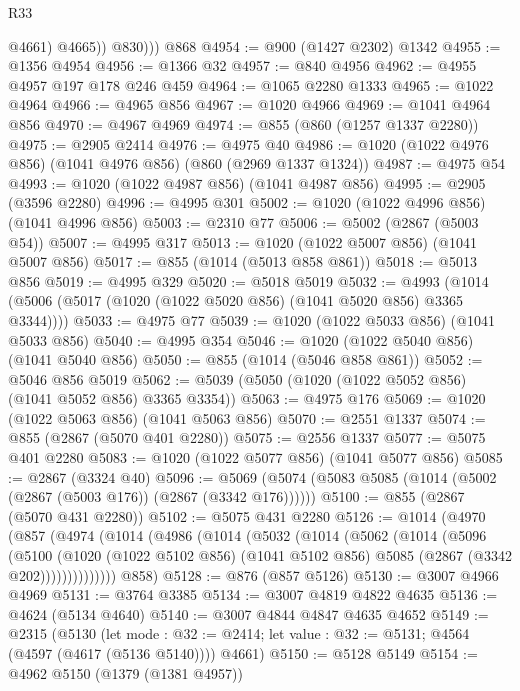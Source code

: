 \begin{lexlean}{R33}
\begin{coremodule}
              @4661)
            @4665))
          @830)))
    @868
@4954 := @900 (@1427 @2302) @1342
@4955 := @1356 @4954
@4956 := @1366 @32
@4957 := @840 @4956
@4962 := @4955 @4957 @197 @178 @246 @459
@4964 := @1065 @2280 @1333
@4965 := @1022 @4964
@4966 := @4965 @856
@4967 := @1020 @4966
@4969 := @1041 @4964 @856
@4970 := @4967 @4969
@4974 := @855 (@860 (@1257 @1337 @2280))
@4975 := @2905 @2414
@4976 := @4975 @40
@4986 := @1020 (@1022 @4976 @856) (@1041 @4976 @856) (@860 (@2969 @1337 @1324))
@4987 := @4975 @54
@4993 := @1020 (@1022 @4987 @856) (@1041 @4987 @856)
@4995 := @2905 (@3596 @2280)
@4996 := @4995 @301
@5002 := @1020 (@1022 @4996 @856) (@1041 @4996 @856)
@5003 := @2310 @77
@5006 := @5002 (@2867 (@5003 @54))
@5007 := @4995 @317
@5013 := @1020 (@1022 @5007 @856) (@1041 @5007 @856)
@5017 := @855 (@1014 (@5013 @858 @861))
@5018 := @5013 @856
@5019 := @4995 @329
@5020 := @5018 @5019
@5032 := @4993 (@1014 (@5006 (@5017 (@1020 (@1022 @5020 @856) (@1041 @5020 @856) @3365 @3344))))
@5033 := @4975 @77
@5039 := @1020 (@1022 @5033 @856) (@1041 @5033 @856)
@5040 := @4995 @354
@5046 := @1020 (@1022 @5040 @856) (@1041 @5040 @856)
@5050 := @855 (@1014 (@5046 @858 @861))
@5052 := @5046 @856 @5019
@5062 := @5039 (@5050 (@1020 (@1022 @5052 @856) (@1041 @5052 @856) @3365 @3354))
@5063 := @4975 @176
@5069 := @1020 (@1022 @5063 @856) (@1041 @5063 @856)
@5070 := @2551 @1337
@5074 := @855 (@2867 (@5070 @401 @2280))
@5075 := @2556 @1337
@5077 := @5075 @401 @2280
@5083 := @1020 (@1022 @5077 @856) (@1041 @5077 @856)
@5085 := @2867 (@3324 @40)
@5096 := @5069 (@5074 (@5083 @5085 (@1014 (@5002 (@2867 (@5003 @176)) (@2867 (@3342 @176))))))
@5100 := @855 (@2867 (@5070 @431 @2280))
@5102 := @5075 @431 @2280
@5126 := @1014
    (@4970
      (@857
        (@4974
          (@1014
            (@4986
              (@1014
                (@5032
                  (@1014
                    (@5062
                      (@1014
                        (@5096
                          (@5100
                            (@1020
                              (@1022 @5102 @856)
                              (@1041 @5102 @856)
                              @5085
                              (@2867 (@3342 @202))))))))))))))
      @858)
@5128 := @876 (@857 @5126)
@5130 := @3007 @4966 @4969
@5131 := @3764 @3385
@5134 := @3007 @4819 @4822 @4635
@5136 := @4624 (@5134 @4640)
@5140 := @3007 @4844 @4847 @4635 @4652
@5149 := @2315
    (@5130
      (let mode : @32 := @2414; let value : @32 := @5131; @4564 (@4597 (@4617 (@5136 @5140))))
      @4661)
@5150 := @5128 @5149
@5154 := @4962 @5150 (@1379 (@1381 @4957))

\end{coremodule}
\end{lexlean}
